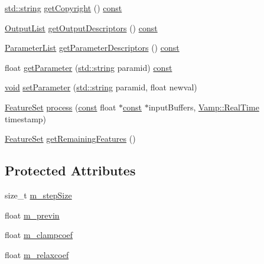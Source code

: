 \begin{DoxyCompactItemize}
\item 
\hyperlink{test__lib_f_l_a_c_2format_8c_ab02026ad0de9fb6c1b4233deb0a00c75}{std\+::string} \hyperlink{class_amplitude_follower_a0c197fc90f30d91cb4403115c83c9134}{get\+Copyright} () \hyperlink{getopt1_8c_a2c212835823e3c54a8ab6d95c652660e}{const} 
\item 
\hyperlink{class_vamp_1_1_plugin_a30f531b8fb69fac41a24e3d2a6a08ed9}{Output\+List} \hyperlink{class_amplitude_follower_a043e3c3db77d76267cd8069e1485bf26}{get\+Output\+Descriptors} () \hyperlink{getopt1_8c_a2c212835823e3c54a8ab6d95c652660e}{const} 
\item 
\hyperlink{class_vamp_1_1_plugin_base_a3b6bb4bbd86affe1ca9deceea1aad4f8}{Parameter\+List} \hyperlink{class_amplitude_follower_a9df01323a09e117bc12354ebe9244edf}{get\+Parameter\+Descriptors} () \hyperlink{getopt1_8c_a2c212835823e3c54a8ab6d95c652660e}{const} 
\item 
float \hyperlink{class_amplitude_follower_ab278c4b6f2ca23248dc94ad775273f39}{get\+Parameter} (\hyperlink{test__lib_f_l_a_c_2format_8c_ab02026ad0de9fb6c1b4233deb0a00c75}{std\+::string} paramid) \hyperlink{getopt1_8c_a2c212835823e3c54a8ab6d95c652660e}{const} 
\item 
\hyperlink{sound_8c_ae35f5844602719cf66324f4de2a658b3}{void} \hyperlink{class_amplitude_follower_ae1fc37ece4d20e40f3066a3361a99340}{set\+Parameter} (\hyperlink{test__lib_f_l_a_c_2format_8c_ab02026ad0de9fb6c1b4233deb0a00c75}{std\+::string} paramid, float newval)
\item 
\hyperlink{class_vamp_1_1_plugin_a448fb57dc245d47923ec9eeaf9856c5f}{Feature\+Set} \hyperlink{class_amplitude_follower_a48d0f95cac31ffd190cff89b50a2a5bd}{process} (\hyperlink{getopt1_8c_a2c212835823e3c54a8ab6d95c652660e}{const} float $\ast$\hyperlink{getopt1_8c_a2c212835823e3c54a8ab6d95c652660e}{const} $\ast$input\+Buffers, \hyperlink{struct_vamp_1_1_real_time}{Vamp\+::\+Real\+Time} timestamp)
\item 
\hyperlink{class_vamp_1_1_plugin_a448fb57dc245d47923ec9eeaf9856c5f}{Feature\+Set} \hyperlink{class_amplitude_follower_a368606f643b88e0df0823d85e36f030c}{get\+Remaining\+Features} ()
\end{DoxyCompactItemize}
\subsection*{Protected Attributes}
\begin{DoxyCompactItemize}
\item 
size\+\_\+t \hyperlink{class_amplitude_follower_a959c2647fd3c5feea2591e3618774027}{m\+\_\+step\+Size}
\item 
float \hyperlink{class_amplitude_follower_ac95e8d2f334821c6c92c706bae29695a}{m\+\_\+previn}
\item 
float \hyperlink{class_amplitude_follower_a1cb205b08cfe2ce94a4af05b18f72876}{m\+\_\+clampcoef}
\item 
float \hyperlink{class_amplitude_follower_aceecd3b3879f32eb4a2e597c32c41cfc}{m\+\_\+relaxcoef}
\end{DoxyCompactItemize}
